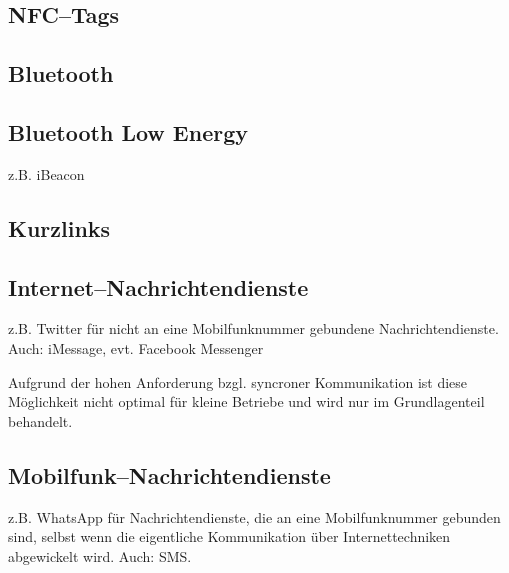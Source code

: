 \subsection{NFC--Tags}
\subsection{Bluetooth}
\subsection{Bluetooth Low Energy}
z.B. iBeacon


\subsection{Kurzlinks}
\subsection{Internet--Nachrichtendienste}

z.B. Twitter für nicht an eine Mobilfunknummer gebundene Nachrichtendienste. Auch: iMessage, evt. Facebook Messenger

Aufgrund der hohen Anforderung bzgl. syncroner Kommunikation ist diese Möglichkeit nicht optimal für kleine Betriebe und wird nur im Grundlagenteil behandelt.

\subsection{Mobilfunk--Nachrichtendienste}

z.B. WhatsApp für Nachrichtendienste, die an eine Mobilfunknummer gebunden sind, selbst wenn die eigentliche Kommunikation über Internettechniken abgewickelt wird. Auch: SMS.

